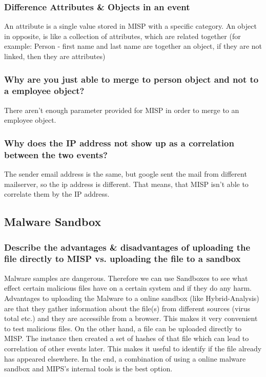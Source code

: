 \subsubsection{Difference Attributes \& Objects in an event}
An attribute is a single value stored in MISP with a specific category. An object in opposite, is like a collection of attributes, which are related together (for example: Person - first name and last name are together an object, if they are not linked, then they are attributes)

\subsubsection{Why are you just able to merge to person object and not to a employee object?}
There aren't enough parameter provided for MISP in order to merge to an employee object.

\subsubsection{Why does the IP address not show up as a correlation between the two events?}
The sender email address is the same, but google sent the mail from different mailserver, so the ip address is different. That means, that MISP isn't able to correlate them by the IP address.

\subsection{Malware Sandbox}

\subsubsection{Describe the advantages \& disadvantages of uploading the file directly to MISP vs. uploading the file to a sandbox}
Malware samples are dangerous. Therefore we can use Sandboxes to see what effect certain malicious files have on a certain system and if they do any harm. Advantages to uploading the Malware to a online sandbox (like Hybrid-Analysis) are that they gather information about the file(s) from different sources (virus total etc.) and they are accessible from a browser. This makes it very convenient to test malicious files.
On the other hand, a file can be uploaded directly to MISP. The instance then created a set of hashes of that file which can lead to correlation of other events later. This makes it useful to identify if the file already has appeared elsewhere.
In the end, a combination of using a online malware sandbox and MIPS's internal tools is the best option.

